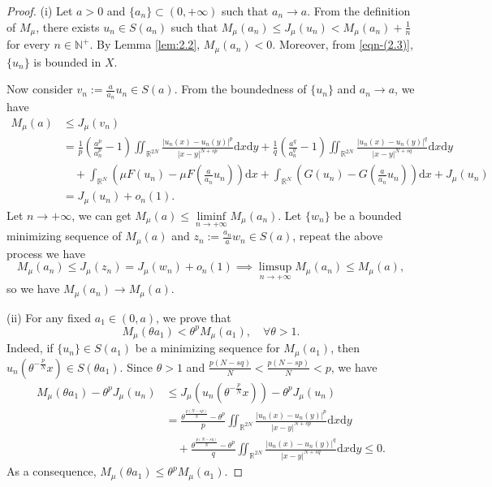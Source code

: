 \documentclass[10pt,a4paper]{amsart}
\numberwithin{equation}{section}
\begin{document}
\begin{proof}
(i) Let $a>0$ and $\{a_n\}\subset(0,+\infty)$ such that $a_n\to a$.
From the definition of  $M_\mu$, there exists $u_n\in S(a_n)$ such that 
$M_\mu(a_n)\le J_\mu(u_n)<M_\mu(a_n)+\frac{1}{n}$ for every $n\in\mathbb{N}^{+}$.
By Lemma \ref{lem:2.2},  $M_\mu(a_n)<0$.
Moreover, from \eqref{eqn-(2.3)}, $\{u_n\}$ is bounded in $X$.

Now consider $v_n:=\frac{a}{a_n}u_n\in S(a)$. From the boundedness of 
$\{u_n\}$ and $a_n\to a$, we have
\begin{align*}
M_\mu(a)&\leq  J_\mu(v_n)\\
&= \frac{1}{p}(\frac{a^{p}}{a_n^{p}}-1)\iint_{\mathbb{R}^{2N}}
\frac{|u_n(x)-u_n(y)|^{p}}{|x-y|^{N+sp}}\mathrm{d}x\mathrm{d}y
+\frac{1}{q}(\frac{a^{q}}{a_n^{q}}-1)\iint_{\mathbb{R}^{2N}}
\frac{|u_n(x)-u_n(y)|^{q}}{|x-y|^{N+sq}}\mathrm{d}x\mathrm{d}y\\
&\quad +\int_{\mathbb{R}^N}(\mu F(u_n)-\mu F(\frac{a}{a_n}u_n))\mathrm{d}x
+\int_{\mathbb{R}^N}( G(u_n)- G(\frac{a}{a_n}u_n))\mathrm{d}x+J_\mu(u_n)\\
&= J_\mu(u_n)+o_n(1).
\end{align*}
Let $n\to +\infty$, we can get $M_\mu(a)\le \underset{n\to +\infty}\liminf  M_\mu(a_n)$.
Let $\{w_n\}$ be a bounded minimizing sequence of $M_\mu(a)$ and 
$z_n:=\frac{a_n}{a}w_n\in S(a)$, repeat the above process we have
$$ 
M_\mu(a_n)\le J_\mu(z_n)=J_\mu(w_n)+o_n(1)\implies 
 \limsup_{n\to+\infty}  M_\mu(a_n)\le M_\mu(a),
$$
so we have $M_\mu(a_n)\to M_\mu(a)$.

(ii) For any fixed $a_1\in(0,a)$, we prove that
\begin{equation}\label{eqn-(2.6)}
M_\mu(\theta a_1)<{\theta}^{p}M_\mu(a_1),\quad\forall\theta>1.
\end{equation}
Indeed, if $\{u_n\}\in S(a_1)$ be a minimizing sequence for $M_\mu(a_1)$, 
then $u_n(\theta^{-\frac{p}{N}}x)\in S(\theta a_1)$.
Since $\theta>1$ and $\frac{p(N-sq)}{N}<\frac{p(N-sp)}{N}<p$, we have
\begin{align*}
M_\mu(\theta a_1)-\theta^{p}J_\mu(u_n)&\leq  J_\mu(u_n(\theta^{-\frac{p}{N}}x))
 -\theta^{p}J_\mu(u_n)\\
&= \frac{\theta^{\frac{p(N-sp)}{N}}-\theta^{p}}{p}
 \iint_{\mathbb{R}^{2N}}\frac{|u_n(x)-u_n(y)|^{p}}{|x-y|^{N+sp}}\mathrm{d}x\mathrm{d}y\\
&\quad +\frac{\theta^{\frac{p(N-sq)}{N}}-\theta^{p}}{q}
 \iint_{\mathbb{R}^{2N}}\frac{|u_n(x)-u_n(y)|^{q}}{|x-y|^{N+sq}}\mathrm{d}x\mathrm{d}y
\leq 0.
\end{align*}
As a consequence, $M_\mu(\theta a_1)\le{\theta}^{p}M_\mu(a_1)$.


\end{proof}
\end{document}
